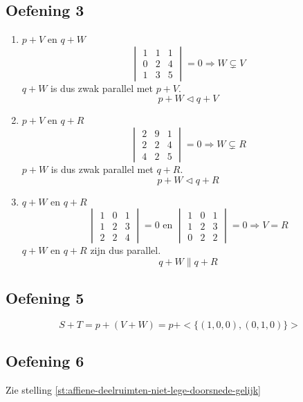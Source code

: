 \documentclass[main.tex]{subfiles}
\begin{document}
\subsection*{Oefening 3}
\begin{enumerate}
\item $p+V$ en $q+W$
  \[
  \begin{vmatrix}
    1 & 1 & 1\\
    0 & 2 & 4\\
    1 & 3 & 5
  \end{vmatrix}
  = 0
  \Rightarrow W \subsetneq V 
  \]
  $q+W$ is dus zwak parallel met $p+V$.
  \[ p+W \triangleleft q+V \]
\item $p+V$ en $q+R$
  \[
  \begin{vmatrix}
    2 & 9 & 1\\
    2 & 2 & 4\\
    4 & 2 & 5
  \end{vmatrix}
  = 0
  \Rightarrow W \subsetneq R 
  \]
  $p+W$ is dus zwak parallel met $q+R$.
  \[ p+W \triangleleft q+R \]
  
\item $q+W$ en $q+R$
  \[
  \begin{vmatrix}
    1 & 0 & 1\\
    1 & 2 & 3\\
    2 & 2 & 4
  \end{vmatrix}
  = 0
  \text{ en }
  \begin{vmatrix}
    1 & 0 & 1\\
    1 & 2 & 3\\
    0 & 2 & 2
  \end{vmatrix}
  = 0
  \Rightarrow V = R
  \]
  $q+W$ en $q+R$ zijn dus parallel.
  \[ q+W \parallel q+R \]
\end{enumerate}


\subsection*{Oefening 5}
\[ S + T = p + (V + W) = p + <\{(1,0,0),(0,1,0)\}>\]

\subsection*{Oefening 6}
Zie stelling \ref{st:affiene-deelruimten-niet-lege-doorsnede-gelijk}
\end{document}

